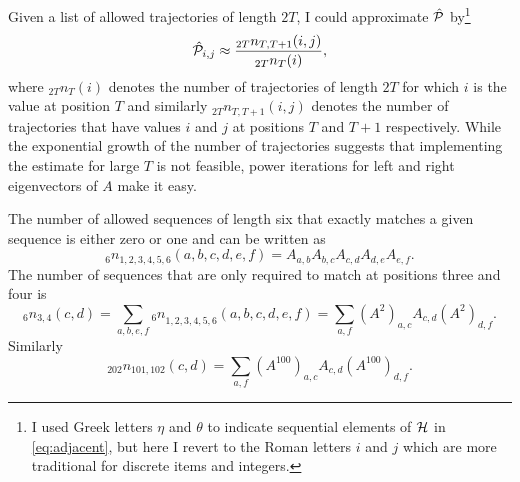 \documentclass[]{article}
\newcommand{\T}{{\cal P}}
\newcommand{\Td}{\hat \T} %
\begin{document}
Given a list of allowed trajectories of length $2T$, I could
approximate $\Td$ by\footnote{I used Greek letters $\eta$ and $\theta$
  to indicate sequential elements of ${\cal H}$ in \eqref{eq:adjacent}, but
  here I revert to the Roman letters $i$ and $j$ which are more
  traditional for discrete items and integers.}
\begin{equation*}
  \Td_{i,j} \approx \frac{_{2T}n_{T,T+1}(i,j)}{_{2T}n_{T}(i)},
\end{equation*}
where $_{2T}n_{T}(i)$ denotes the number of trajectories of length
$2T$ for which $i$ is the value at position $T$ and similarly
$_{2T}n_{T,T+1}(i,j)$ denotes the number of trajectories that have
values $i$ and $j$ at positions $T$ and $T+1$ respectively.  While the
exponential growth of the number of trajectories suggests that
implementing the estimate for large $T$ is not feasible, power
iterations for left and right eigenvectors of $A$ make it easy.

The number of allowed sequences of length six that exactly matches a
given sequence is either zero or one and can be written as
\begin{equation*}
  _6n_{1,2,3,4,5,6}(a,b,c,d,e,f) = A_{a,b}A_{b,c}A_{c,d}A_{d,e}A_{e,f}.
\end{equation*}
The number of sequences that are only required to match at positions
three and four is
\begin{equation*}
 _6n_{3,4}(c,d) =  \sum_{a,b,e,f} {_6n}_{1,2,3,4,5,6}(a,b,c,d,e,f) =
 \sum_{a,f} \left(A^2\right)_{a,c} A_{c,d} \left(A^2\right)_{d,f}.
\end{equation*}
Similarly
\begin{equation*}
 _{202}n_{101,102}(c,d) = \sum_{a,f} \left(A^{100}\right)_{a,c}
 A_{c,d} \left(A^{100}\right)_{d,f}.
\end{equation*}
\end{document}
